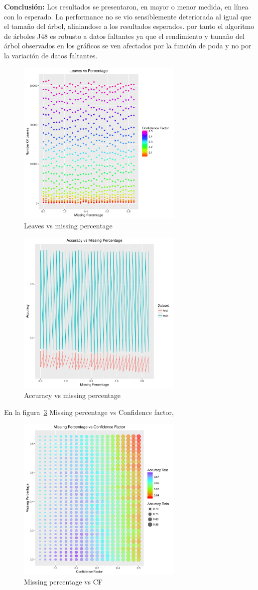 \textbf{Conclusión:} Los resultados se presentaron, en mayor o menor medida, en línea con lo esperado. La performance no 
se vio sensiblemente deteriorada al igual que el tamaño del árbol, aliniandose a los resultados esperados. 
por tanto  el algoritmo de árboles J48 es robusto a datos faltantes
ya que el rendimiento y  tamaño del árbol observados en los gráficos  se ven afectados por la función de poda y no por la
variación de datos faltantes.

\begin{figure}
  \centering
  \includegraphics[width = 8cm]{4b.pdf}
  \caption{Leaves vs missing percentage}
  \label{fig:4b}
\end{figure}

\begin{figure}
  \centering
  \includegraphics[width = 8cm]{4c.pdf}
  \caption{Accuracy vs missing percentage}
  \label{fig:4c}
\end{figure}

En la figura~\ref{fig:4d} Missing percentage vs Confidence factor,

\begin{figure}
  \centering
  \includegraphics[width = 8cm]{4d.pdf}
  \caption{Missing percentage vs CF}
  \label{fig:4d}
\end{figure}
